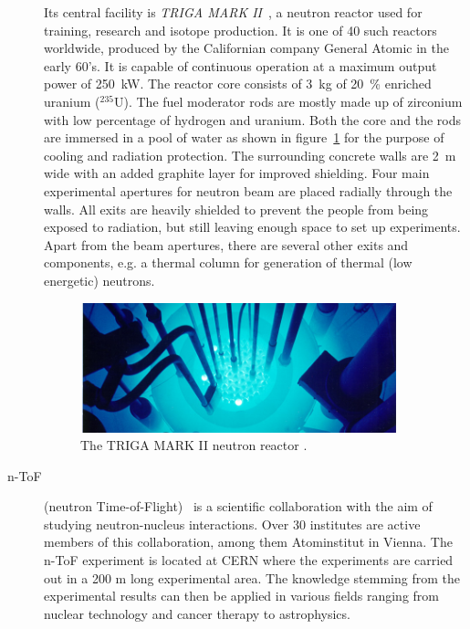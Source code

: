 \begin{description}
Its central facility is \emph{TRIGA MARK II}~\cite{Triga:00000}, a neutron reactor used for training, research and isotope production. It is one of 40 such reactors worldwide, produced by the Californian company General Atomic in the early 60's. It is capable of continuous operation at a maximum output power of 250~kW. 
The reactor core consists of 3~kg of 20~\% enriched uranium ($^{235}$U). The fuel moderator rods are mostly made up of zirconium with low percentage of hydrogen and uranium. Both the core and the rods are immersed in a pool of water as shown in figure~\ref{fig:triga} for the purpose of cooling and radiation protection. The surrounding concrete walls are 2~m wide with an added graphite layer for improved shielding. Four main experimental apertures for neutron beam are placed radially through the walls. All exits are heavily shielded to prevent the people from being exposed to radiation, but still leaving enough space to set up experiments. Apart from the beam apertures, there are several other exits and components, e.g. a thermal column for generation of thermal (low energetic) neutrons.

\begin{figure}[!t]
\centering
\includegraphics[width=0.9\textwidth]{01_introduction/pics/triga}
\caption{The TRIGA MARK II neutron reactor \cite{GeneralAtomics}.}
\label{fig:triga}
\end{figure}




\item[n-ToF] (neutron Time-of-Flight)~\cite{NTOF:00000} is a scientific collaboration with the aim of studying neutron-nucleus interactions. Over 30 institutes are active members of this collaboration, among them Atominstitut in Vienna. The n-ToF experiment is located at CERN where the experiments are carried out in a 200 m long experimental area. The knowledge stemming from the experimental results can then be applied in various fields ranging from nuclear technology and cancer therapy to astrophysics.


\end{description}
